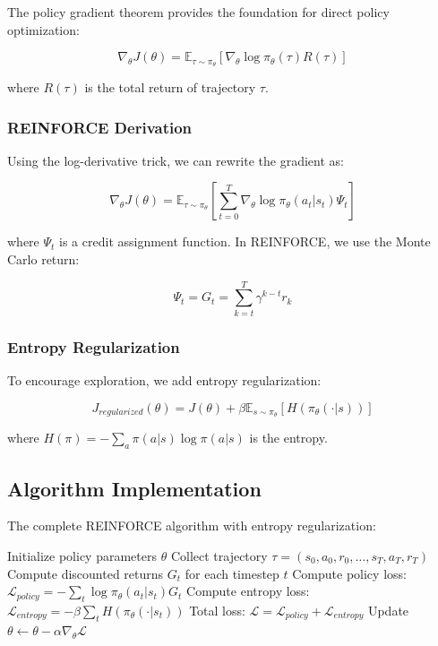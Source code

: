 \documentclass{article}
\begin{document}
The policy gradient theorem provides the foundation for direct policy optimization:

\[\nabla_\theta J(\theta) = \mathbb{E}_{\tau \sim \pi_\theta} \left[ \nabla_\theta \log \pi_\theta(\tau) R(\tau) \right]\]

where $R(\tau)$ is the total return of trajectory $\tau$.

\subsubsection{REINFORCE Derivation}

Using the log-derivative trick, we can rewrite the gradient as:

\[\nabla_\theta J(\theta) = \mathbb{E}_{\tau \sim \pi_\theta} \left[ \sum_{t=0}^T \nabla_\theta \log \pi_\theta(a_t|s_t) \Psi_t \right]\]

where $\Psi_t$ is a credit assignment function. In REINFORCE, we use the Monte Carlo return:

\[\Psi_t = G_t = \sum_{k=t}^T \gamma^{k-t} r_k\]

\subsubsection{Entropy Regularization}

To encourage exploration, we add entropy regularization:

\[J_{regularized}(\theta) = J(\theta) + \beta \mathbb{E}_{s \sim \pi_\theta} [H(\pi_\theta(\cdot|s))]\]

where $H(\pi) = -\sum_a \pi(a|s) \log \pi(a|s)$ is the entropy.

\subsection{Algorithm Implementation}

The complete REINFORCE algorithm with entropy regularization:

\begin{algorithm}
\caption{REINFORCE with Entropy Regularization}
\begin{algorithmic}[1]
\State Initialize policy parameters $\theta$
    \State Collect trajectory $\tau = (s_0, a_0, r_0, \dots, s_T, a_T, r_T)$
    \State Compute discounted returns $G_t$ for each timestep $t$
    \State Compute policy loss: $\mathcal{L}_{policy} = -\sum_t \log \pi_\theta(a_t|s_t) G_t$
    \State Compute entropy loss: $\mathcal{L}_{entropy} = -\beta \sum_t H(\pi_\theta(\cdot|s_t))$
    \State Total loss: $\mathcal{L} = \mathcal{L}_{policy} + \mathcal{L}_{entropy}$
    \State Update $\theta \leftarrow \theta - \alpha \nabla_\theta \mathcal{L}$
\EndFor
\end{algorithmic}
\end{algorithm}
\end{document}
